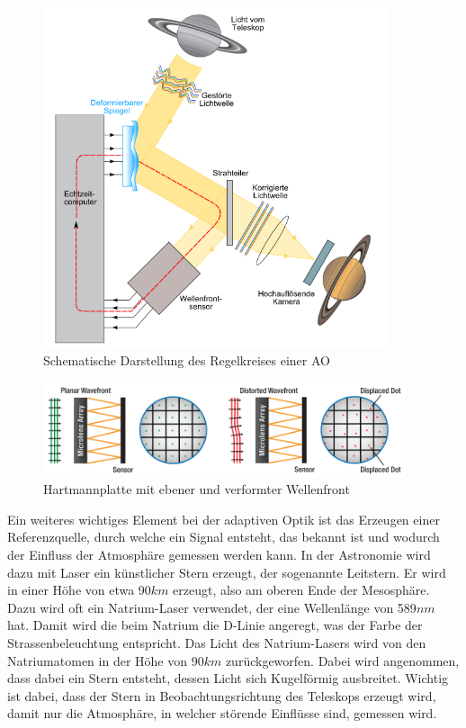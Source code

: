 \begin{refsection}
\begin{figure}
  \centering
  \includegraphics[width=0.9\textwidth]{adaptiv/images/schematichAO}
  \caption{Schematische Darstellung des Regelkreises einer AO
    \cite{robani:schematischAO}}
  \label{fig:schematischAO}
\end{figure}

\begin{figure}
  \centering
  \includegraphics[width=0.95\textwidth]{adaptiv/images/hartmannplatte}
  \caption{Hartmannplatte mit ebener und verformter Wellenfront
    \cite{thor:hartmannplatte}}
  \label{fig:hartmannplatte}
\end{figure}

Ein weiteres wichtiges Element bei der adaptiven Optik ist das Erzeugen einer Referenzquelle, durch welche ein Signal entsteht, das bekannt ist und wodurch der Einfluss der Atmosphäre gemessen werden kann. In der Astronomie wird dazu mit Laser ein künstlicher Stern erzeugt, der sogenannte Leitstern. Er wird in einer Höhe von etwa 90$km$ erzeugt, also am oberen Ende der Mesosphäre. Dazu wird oft ein Natrium-Laser verwendet, der eine Wellenlänge von 589$nm$ hat. Damit wird die beim Natrium die D-Linie angeregt, was der Farbe der Strassenbeleuchtung entspricht. Das Licht des Natrium-Lasers wird von den Natriumatomen in der Höhe von 90$km$ zurückgeworfen. Dabei wird angenommen, dass dabei ein Stern entsteht, dessen Licht sich Kugelförmig ausbreitet. Wichtig ist dabei, dass der Stern in Beobachtungsrichtung des Teleskops erzeugt wird, damit nur die Atmosphäre, in welcher störende Einflüsse sind, gemessen wird. 



\end{refsection}
